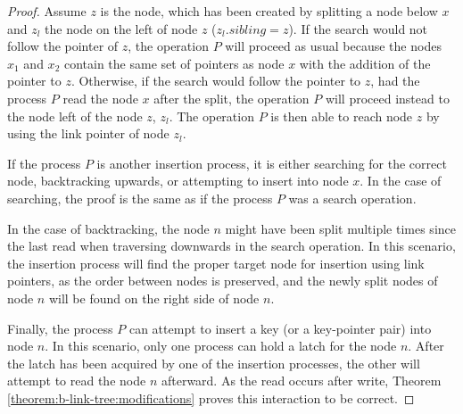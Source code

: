 \begin{proof}
  Assume $z$ is the node, which has been created by splitting a node below $x$ and $z_l$ the node on the left of node $z$ ($z_l.sibling = z$).
  If the search would not follow the pointer of $z$, the operation $P$ will proceed as usual because the nodes $x_1$ and $x_2$ contain the same set of pointers as node $x$ with the addition of the pointer to $z$. Otherwise, if the search would follow the pointer to $z$, had the process $P$ read the node $x$ after the split, the operation $P$ will proceed instead to the node left of the node $z$, $z_l$. The operation $P$ is then able to reach node $z$ by using the link pointer of node $z_l$.

  If the process $P$ is another insertion process, it is either searching for the correct node, backtracking upwards, or attempting to insert into node $x$. In the case of searching, the proof is the same as if the process $P$ was a search operation.

  In the case of backtracking, the node $n$ might have been split multiple times since the last read when traversing downwards in the search operation. In this scenario, the insertion process will find the proper target node for insertion using link pointers, as the order between nodes is preserved, and the newly split nodes of node $n$ will be found on the right side of node $n$.

  Finally, the process $P$ can attempt to insert a key (or a key-pointer pair) into node $n$. In this scenario, only one process can hold a latch for the node $n$. After the latch has been acquired by one of the insertion processes, the other will attempt to read the node $n$ afterward. As the read occurs after write, Theorem \ref{theorem:b-link-tree:modifications} proves this interaction to be correct.

\end{proof}

